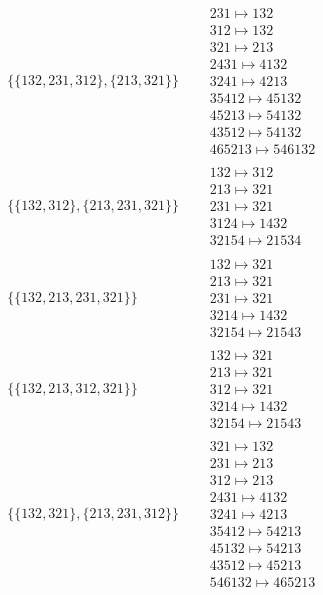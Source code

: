 \begin{tiny}
\begin{align}
\{\{132, 231, 312\}, \{213, 321\}\}
\quad
&
\begin{matrix}
231 \mapsto 132\\312 \mapsto 132\\321 \mapsto 213\\2431 \mapsto 4132\\3241 \mapsto 4213\\35412 \mapsto 45132\\45213 \mapsto 54132\\43512 \mapsto 54132\\465213 \mapsto 546132
\end{matrix}
\\
\{\{132, 312\}, \{213, 231, 321\}\}
\quad
&
\begin{matrix}
132 \mapsto 312\\213 \mapsto 321\\231 \mapsto 321\\3124 \mapsto 1432\\32154 \mapsto 21534
\end{matrix}
\\
\{\{132, 213, 231, 321\}\}
\quad
&
\begin{matrix}
132 \mapsto 321\\213 \mapsto 321\\231 \mapsto 321\\3214 \mapsto 1432\\32154 \mapsto 21543
\end{matrix}
\\
\{\{132, 213, 312, 321\}\}
\quad
&
\begin{matrix}
132 \mapsto 321\\213 \mapsto 321\\312 \mapsto 321\\3214 \mapsto 1432\\32154 \mapsto 21543
\end{matrix}
\\
\{\{132, 321\}, \{213, 231, 312\}\}
\quad
&
\begin{matrix}
321 \mapsto 132\\231 \mapsto 213\\312 \mapsto 213\\2431 \mapsto 4132\\3241 \mapsto 4213\\35412 \mapsto 54213\\45132 \mapsto 54213\\43512 \mapsto 45213\\546132 \mapsto 465213

\end{matrix}
\end{align}
\end{tiny}
